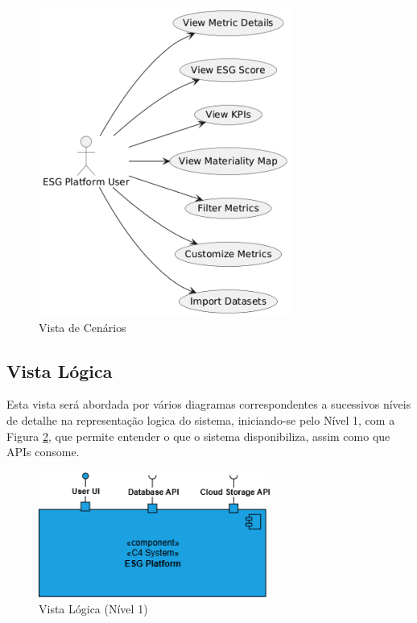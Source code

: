 \begin{figure}[H]
    \centering
    \includegraphics[height=4in,keepaspectratio]{frontmatter/assets/diagrams/Scenario View/Scenario_View.png}
    \caption{Vista de Cenários}
    \label{fig:scenario_view}
\end{figure}

\subsection{Vista Lógica}

Esta vista será abordada por vários diagramas correspondentes a sucessivos níveis de detalhe na representação logica do sistema, iniciando-se pelo Nível 1, com a Figura \ref{fig:logical_view_lv1}, que permite entender o que o sistema disponibiliza, assim como que APIs consome.

\begin{figure}[H]
    \centering
    \includegraphics[width=3in,keepaspectratio]{frontmatter/assets/diagrams/Logical View/Logical View Lv1.drawio.png}
    \caption{Vista Lógica (Nível 1)}
    \label{fig:logical_view_lv1}
\end{figure}

